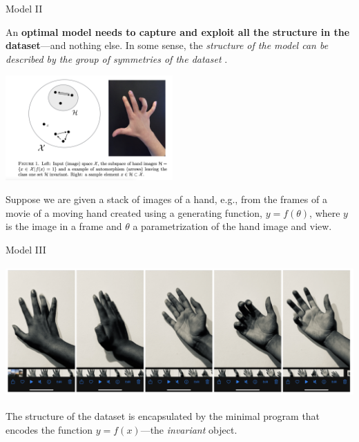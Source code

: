 \begin{frame}[label=ladila]{Model II}

An {\bf optimal model needs to capture and exploit all the structure in the dataset}---and nothing else. In some sense, the {\em structure of the model can be described by the group of symmetries of the dataset}  \citep{Ruffini:2016ad}. 
 \begin{center}%
  \includegraphics[height=4cm]{img/hand2.png}
  \end{center}
  
Suppose we are given a stack of images of a hand, e.g., from the frames of a movie of a moving hand created using a generating function,
$y = f(\theta)$, where $y$ is the image in a frame and $\theta$ a parametrization of the hand image and view.
\end{frame}

\begin{frame}[label=ladila]{Model III}
 \begin{center}%
  \includegraphics[height=5cm]{img/hands.png}
  \end{center}
  The structure of the dataset is encapsulated by the minimal program that encodes the function $y=f(x)$---the {\em invariant} object.  %
\end{frame}



